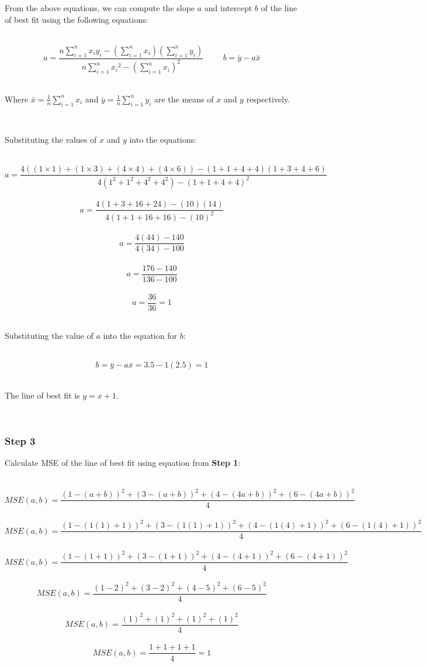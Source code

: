 \documentclass{article}
\begin{document}
\parbox{\textwidth}{
From the above equations, we can compute the slope $a$ and intercept $b$ of the line of best fit using the following equations:
}\\

$$a = \frac{n\sum_{i=1}^{n}x_i y_i - (\sum_{i=1}^{n}x_i)(\sum_{i=1}^{n}y_i)}{n\sum_{i=1}^{n}{x_i}^2-(\sum_{i=1}^{n}{x_i})^2} \hspace{1cm} b =\bar{y}-a\bar{x}$$\\

\parbox{\textwidth}{
Where $\bar{x} = \frac{1}{n}\sum_{i=1}^{n}x_i$ and $\bar{y} = \frac{1}{n}\sum_{i=1}^{n}y_i$ are the means of $x$ and $y$ respectively.
}\\

\parbox{\textwidth}{
Substituting the values of $x$ and $y$ into the equations:
}\\

$$a = \frac{4((1\times1)+(1\times3)+(4\times4)+(4\times6)) - (1+1+4+4)(1+3+4+6)}{4(1^2+1^2+4^2+4^2)-(1+1+4+4)^2}$$\\
$$a = \frac{4(1+3+16+24) - (10)(14)}{4(1+1+16+16)-(10)^2}$$\\
$$a = \frac{4(44) - 140}{4(34)-100}$$\\
$$a = \frac{176 - 140}{136-100}$$\\
$$a = \frac{36}{36} = 1$$\\

\parbox{\textwidth}{
Substituting the value of $a$ into the equation for $b$:
}\\

$$b = \bar{y}-a\bar{x} = 3.5 - 1(2.5) = 1$$\\
\parbox{\textwidth}{
The line of best fit is $y = x + 1$.
}\\
\subsubsection*{Step 3}
\parbox{\textwidth}{
Calculate MSE of the line of best fit using equation from \textbf{Step 1}:
}\\
$$MSE(a,b) = \frac{(1-(a+b))^2+(3-(a+b))^2+(4-(4a+b))^2+(6-(4a+b))^2}{4} $$\\
$$MSE(a,b) = \frac{(1-(1(1)+1))^2+(3-(1(1)+1))^2+(4-(1(4)+1))^2+(6-(1(4)+1))^2}{4} $$\\
$$MSE(a,b) = \frac{(1-(1+1))^2+(3-(1+1))^2+(4-(4+1))^2+(6-(4+1))^2}{4} $$\\
$$MSE(a,b) = \frac{(1-2)^2+(3-2)^2+(4-5)^2+(6-5)^2}{4} $$\\
$$MSE(a,b) = \frac{(1)^2+(1)^2+(1)^2+(1)^2}{4} $$\\
$$MSE(a,b) = \frac{1+1+1+1}{4} = 1$$\\
\end{document}
